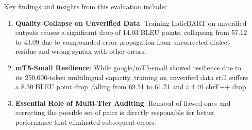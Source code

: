 Key findings and insights from this evaluation include:
\begin{enumerate}
    \item \textbf{Quality Collapse on Unverified Data}: Training IndicBART on unverified outputs causes a significant drop of 14.03 BLEU points, collapsing from 57.12 to 43.09 due to compounded error propagation from uncorrected dialect residue and wrong syntax with other errors.
    \item \textbf{mT5-Small Resilience}: While google/mT5-small showed resilience due to its 250,000-token multilingual capacity, training on unverified data still suffers a 8.30 BLEU point drop ,falling from 69.51 to 61.21 and a 4.40 chrF++ drop.
    \item \textbf{Essential Role of Multi-Tier Auditing}: Removal of flawed ones and correcting the possible set of pairs is directly responsible for better performance that eliminated subsequent errors.
\end{enumerate}



%


